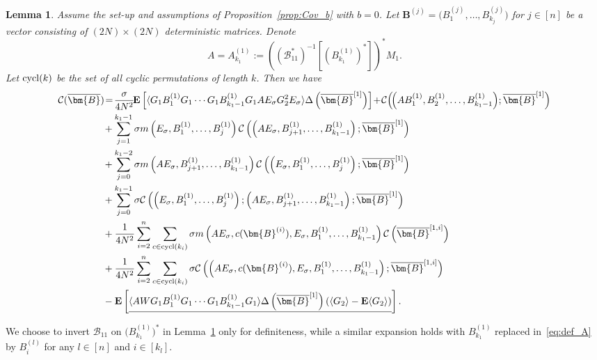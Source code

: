 \documentclass[10pt]{amsart}
\newtheorem{lemma}[theorem]{Lemma}
\numberwithin{equation}{section}
\newcommand{\E}{\mathbf{E}}
\begin{document}
\begin{lemma}\label{lem:av_C_dif} Assume the set-up and assumptions of Proposition~\ref{prop:Cov_b} with $b=0$. Let $\bm{B}^{(j)}=\big(B_1^{(j)},\ldots, B_{k_j}^{(j)}\big)$ for $j\in[n]$ be a vector consisting of $(2N)\times (2N)$ deterministic matrices. Denote 
\begin{equation}
A=A_{k_1}^{(1)}:=\left(\left(\mathcal{B}_{11}^*\right)^{-1}\left[ \left(B_{k_1}^{(1)}\right)^*\right]\right)^*M_1.
\label{eq:def_A}
\end{equation}
Let ${\rm cycl}(k)$ be the set of all cyclic permutations of length $k$. Then we have
\begin{align}
\mathcal{C}(\overline{\bm{B}}) \!&= \! \frac{\sigma}{4N^2}\!\E\left[\langle G_1B_1^{(1)}G_1\cdots G_1B_{k_1-1}^{(1)}G_1AE_\sigma G_2^2 E_\sigma\rangle\Delta\left(\overline{\bm{B}}^{[1]}\right)\right]\!+\!\mathcal{C}\!\left(\!\left(AB_1^{(1)},B_2^{(1)},\ldots,B_{k_1-1}^{(1)}\right)\!; \overline{\bm{B}}^{[1]}\right) \label{eq:av_C_dif}\\ 
&+\sum_{j=1}^{k_1-1} \sigma m\left(E_\sigma, B_1^{(1)},\ldots, B_j^{(1)}\right)\mathcal{C}\left(\left(AE_\sigma, B_{j+1}^{(1)},\ldots, B_{k_1-1}^{(1)}\right); \overline{\bm{B}}^{[1]}\right) \nonumber\\ 
&+\sum_{j=0}^{k_1-2} \sigma m\left(AE_\sigma, B_{j+1}^{(1)},\ldots, B_{k_1-1}^{(1)}\right)\mathcal{C}\left(\left(E_\sigma,B_1^{(1)},\ldots, B_j^{(1)}\right); \overline{\bm{B}}^{[1]}\right)\nonumber\\
&+ \sum_{j=0}^{k_1-1} \sigma \mathcal{C}\left(\left(E_\sigma,B_1^{(1)},\ldots,B_j^{(1)}\right);\left(AE_\sigma,B_{j+1}^{(1)},\ldots,B_{k_1-1}^{(1)}\right);\overline{\bm{B}}^{[1]}\right)\nonumber\\
&+\frac{1}{4N^2}\sum_{i=2}^n \sum_{c\in {\rm{cycl}}(k_i)}\sigma m\left(AE_\sigma,c(\bm{B}^{(i)}),E_\sigma,B_1^{(1)},\ldots, B_{k_1-1}^{(1)}\right)\mathcal{C}\left(\overline{\bm{B}}^{[1,i]}\right)\nonumber\\
&+\frac{1}{4N^2}\sum_{i=2}^n \sum_{c\in {\rm{cycl}}(k_i)} \sigma\mathcal{C}\left(\left(AE_\sigma,c(\bm{B}^{(i)}),E_\sigma, B_1^{(1)},\ldots, B_{k_1-1}^{(1)}\right);\overline{\bm{B}}^{[1,i]}\right)\nonumber\\
&-\E\left[\underline{\langle AWG_1B_1^{(1)}G_1\cdots G_1B_{k_1-1}^{(1)}G_1\rangle\Delta\left(\overline{\bm{B}}^{[1]}\right)\left(\langle G_2\rangle - \E\langle G_2\rangle\right)}\right].\nonumber
\end{align}
\end{lemma}
We choose to invert $\mathcal{B}_{11}$ on $\big(B_{k_1}^{(1)}\big)^*$ in Lemma~\ref{lem:av_C_dif} only for definiteness, while a similar expansion holds with $B_{k_1}^{(1)}$ replaced in~\eqref{eq:def_A} by $B_i^{(l)}$ for any $l\in [n]$ and $i\in [k_l]$.
\end{document}
